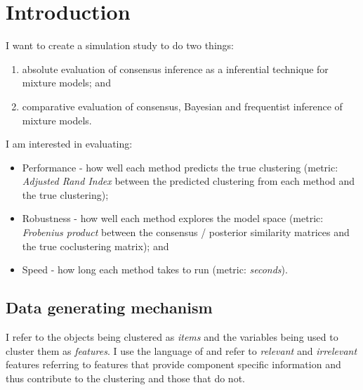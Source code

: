 \documentclass[
]{book}
\providecommand{\tightlist}{%
  \setlength{\itemsep}{0pt}\setlength{\parskip}{0pt}}
\begin{document}
\hypertarget{introduction}{%
\chapter{Introduction}\label{introduction}}

I want to create a simulation study to do two things:

\begin{enumerate}
\def\labelenumi{\arabic{enumi}.}
\tightlist
\item
  absolute evaluation of consensus inference as a inferential technique for mixture models; and
\item
  comparative evaluation of consensus, Bayesian and frequentist inference of mixture models.
\end{enumerate}

I am interested in evaluating:

\begin{itemize}
\tightlist
\item
  Performance - how well each method predicts the true clustering (metric: \emph{Adjusted Rand Index} \citep{hubert1985comparing} between the predicted clustering from each method and the true clustering);
\item
  Robustness - how well each method explores the model space (metric: \emph{Frobenius product} between the consensus / posterior similarity matrices and the true coclustering matrix); and
\item
  Speed - how long each method takes to run (metric: \emph{seconds}).
\end{itemize}

\hypertarget{data-generating-mechanism}{%
\section{Data generating mechanism}\label{data-generating-mechanism}}

I refer to the objects being clustered as \emph{items} and the variables being used to cluster them as \emph{features}. I use the language of \citet{law2003feature} and refer to \emph{relevant} and \emph{irrelevant} features referring to features that provide component specific information and thus contribute to the clustering and those that do not.
\end{document}
